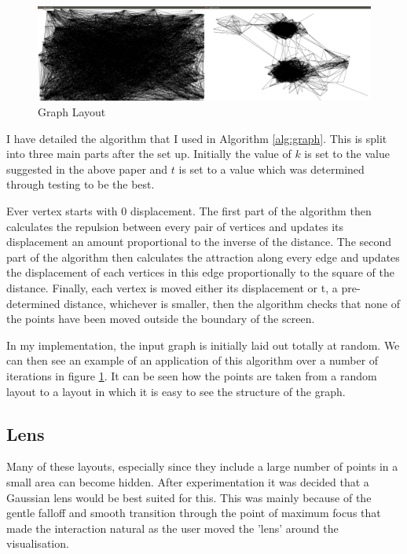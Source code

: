 \documentclass[12pt,a4paper]{article}
\begin{document}
\begin{figure}[htb]
\caption{Graph Layout}
\label{fig:layout}
\centering
\includegraphics[scale=0.12]{Pygame.png}
\end{figure}

I have detailed the algorithm that I used in Algorithm \ref{alg:graph}. This is split into three main parts after the set up. Initially the value of $k$ is set to the value suggested in the above paper and $t$ is set to a value which was determined through testing to be the best.

Ever vertex starts with 0 displacement. The first part of the algorithm then calculates the repulsion between every pair of vertices and updates its displacement an amount proportional to the inverse of the distance. The second part of the algorithm then calculates the attraction along every edge and updates the displacement of each vertices in this edge proportionally to the square of the distance. Finally, each vertex is moved either its displacement or t, a pre-determined distance, whichever is smaller, then the algorithm checks that none of the points have been moved outside the boundary of the screen.

In my implementation, the input graph is initially laid out totally at random. We can then see an example of an application of this algorithm over a number of iterations in figure \ref{fig:layout}. It can be seen how the points are taken from a random layout to a layout in which it is easy to see the structure of the graph.

\subsection{Lens}

Many of these layouts, especially since they include a large number of points in a small area can become hidden. After experimentation it was decided that a Gaussian lens would be best suited for this. This was mainly because of the gentle falloff and smooth transition through the point of maximum focus that made the interaction natural as the user moved the 'lens' around the visualisation.
\end{document}
